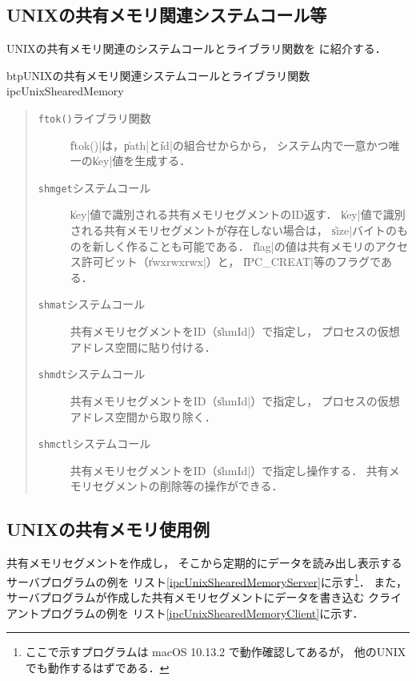 \subsection{UNIXの共有メモリ関連システムコール等}
UNIXの共有メモリ関連のシステムコールとライブラリ関数を
に紹介する．

\begin{myfig}{btp}{UNIXの共有メモリ関連システムコールとライブラリ関数}
  {ipcUnixShearedMemory}
  
\end{myfig}

\begin{quote}
  \begin{description}
  \item [\texttt{ftok()}ライブラリ関数]
    \|ftok()|は，\|path|と\|id|の組合せからから，
    システム内で一意かつ唯一の\|key|値を生成する．

  \item [\texttt{shmget}システムコール]
    \|key|値で識別される共有メモリセグメントのID返す．
    \|key|値で識別される共有メモリセグメントが存在しない場合は，
    \|size|バイトのものを新しく作ることも可能である．
    \|flag|の値は共有メモリのアクセス許可ビット（\|rwxrwxrwx|）と，
    \|IPC_CREAT|等のフラグである．

  \item [\texttt{shmat}システムコール]
    共有メモリセグメントをID（\|shmId|）で指定し，
    プロセスの仮想アドレス空間に貼り付ける．

  \item [\texttt{shmdt}システムコール]
    共有メモリセグメントをID（\|shmId|）で指定し，
    プロセスの仮想アドレス空間から取り除く．

  \item [\texttt{shmctl}システムコール]
    共有メモリセグメントをID（\|shmId|）で指定し操作する．
    共有メモリセグメントの削除等の操作ができる．
  \end{description}
\end{quote}

\subsection{UNIXの共有メモリ使用例}
共有メモリセグメントを作成し，
そこから定期的にデータを読み出し表示するサーバプログラムの例を
リスト\ref{ipcUnixShearedMemoryServer}に示す\footnote{
  ここで示すプログラムは macOS 10.13.2 で動作確認してあるが，
  他のUNIXでも動作するはずである．}．
また，サーバプログラムが作成した共有メモリセグメントにデータを書き込む
クライアントプログラムの例を
リスト\ref{ipcUnixShearedMemoryClient}に示す．

